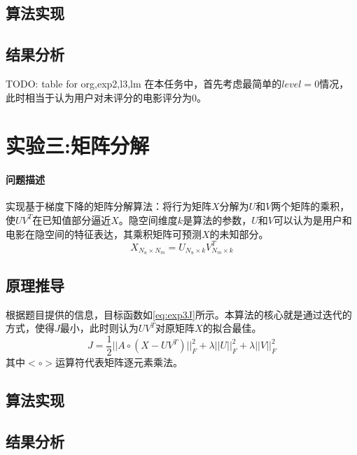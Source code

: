 \documentclass[a4paper,12pt]{article}
\begin{document}
    \subsection{算法实现}

    \subsection{结果分析}
    TODO: table for org,exp2,l3,lm
    在本任务中，首先考虑最简单的$level=0$情况，此时相当于认为用户对未评分的电影评分为0。
    \section{实验三:矩阵分解}
    \paragraph{问题描述}
    实现基于梯度下降的矩阵分解算法：将行为矩阵$X$分解为$U$和$V$两个矩阵的乘积，使$UV^T$在已知值部分逼近$X$。隐空间维度$k$是算法的参数，$U$和$V$可以认为是用户和电影在隐空间的特征表达，其乘积矩阵可预测$X$的未知部分。
    $$
      X_{N_u\times N_m} = U_{N_u\times k}V_{N_m\times k}^T
    $$
    \subsection{原理推导}
    根据题目提供的信息，目标函数如\cref{eq:exp3J}所示。本算法的核心就是通过迭代的方式，使得$J$最小，此时则认为$UV^T$对原矩阵$X$的拟合最佳。
    \begin{equation}
      \label{eq:exp3J}
      J =\frac{1}{2} ||A\circ (X-UV^T)||_F^2 + \lambda ||U||_F^2 + \lambda ||V||_F^2
    \end{equation}
    其中$<\circ>$运算符代表矩阵逐元素乘法。
    \subsection{算法实现}

    \subsection{结果分析}

    \label{applastpage}
    \newpage
    
    
\iffalse
\begin{itemize}[noitemsep,topsep=0pt]
\end{itemize}
\begin{enumerate}[label=\Roman{*}.,noitemsep,topsep=0pt]
\end{enumerate}
\begin{multicols}{2}
\end{multicols}
\fi
\end{document}
